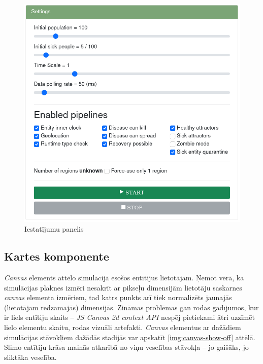 \begin{figure}[H]
	\centering
	\includegraphics[scale=0.4]{images/settings.png}
	\caption{Iestatījumu panelis}
	\label{img:settings}
\end{figure}

\subsection{Kartes komponente}

\emph{Canvas} elements attēlo simulācijā esošos entītijus lietotājam. Ņemot vērā, ka
simulācijas plaknes izmēri nesakrīt ar pikseļu dimensijām lietotāju saskarnes
\emph{canvas} elementa izmēriem, tad katrs punkts arī tiek normalizēts jaunajās
(lietotājam redzamajās) dimensijās. Zināmas problēmas gan rodas gadījumos, kur
ir liels entītiju skaits -- \emph{JS Canvas 2d context API} nespēj pietiekami ātri
uzzīmēt lielo elementu skaitu, rodas vizuāli artefakti. \emph{Canvas} elementus
ar dažādiem simulācijas stāvokļiem dažādās stadijās var apskatīt \ref{img:canvas-show-off} attēlā.
Slimo entītiju krāsa mainās atkarībā no viņu veselības stāvokļa -- jo gaišāks, jo sliktāka veselība.

